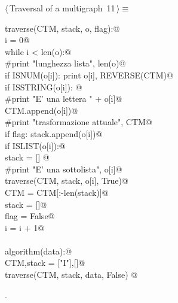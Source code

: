\documentclass[11pt,oneside]{article}	%
\begin{document}
\begin{flushleft} \small \label{scrap26}
\protect{}$\langle\,$Traversal of a multigraph\nobreak\ {\footnotesize 11}$\,\rangle\equiv$
\vspace{-1ex}
\begin{list}{}{} \item
\mbox{}\verb@def traverse(CTM, stack, o, flag):@\\
\mbox{}\verb@    i = 0@\\
\mbox{}\verb@    while i < len(o):@\\
\mbox{}\verb@        #print "lunghezza lista", len(o)@\\
\mbox{}\verb@        if ISNUM(o[i]): print o[i], REVERSE(CTM)@\\
\mbox{}\verb@        if ISSTRING(o[i]): @\\
\mbox{}\verb@            #print "E' una lettera " + o[i]@\\
\mbox{}\verb@            CTM.append(o[i])@\\
\mbox{}\verb@            #print "trasformazione attuale", CTM@\\
\mbox{}\verb@            if flag: stack.append(o[i])@\\
\mbox{}\verb@        if ISLIST(o[i]):@\\
\mbox{}\verb@            stack = [] @\\
\mbox{}\verb@            #print "E' una sottolista", o[i]@\\
\mbox{}\verb@            traverse(CTM, stack, o[i], True)@\\
\mbox{}\verb@            CTM = CTM[:-len(stack)]@\\
\mbox{}\verb@            stack = []@\\
\mbox{}\verb@            flag = False@\\
\mbox{}\verb@        i = i + 1@\\
\mbox{}\verb@@\\
\mbox{}\verb@def algorithm(data):@\\
\mbox{}\verb@    CTM,stack = ["I"],[]@\\
\mbox{}\verb@    traverse(CTM, stack, data, False)  @\\
\mbox{}\verb@@{\NWsep}
\end{list}
\vspace{-1ex}
\footnotesize\addtolength{\baselineskip}{-1ex}
\begin{list}{}{\setlength{\itemsep}{-\parsep}\setlength{\itemindent}{-\leftmargin}}
\item {\NWtxtMacroNoRef}.
\end{list}
\end{flushleft}
  
\end{document}

